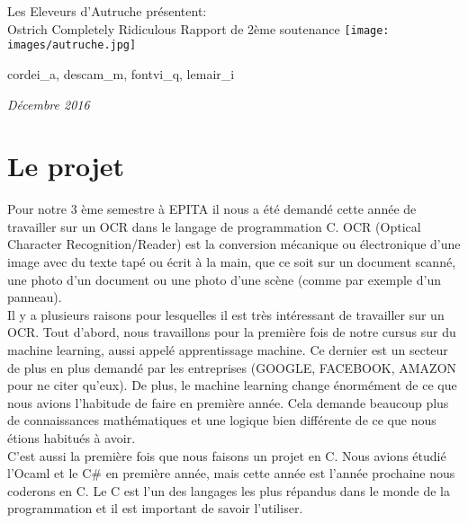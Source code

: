\documentclass[14pt]{article}
\begin{document}
\begin{center}
\huge Les Eleveurs d'Autruche 
\newline
\LARGE pr\'esentent:
\\
\huge Ostrich Completely Ridiculous
\huge Rapport de 2\`eme soutenance
\newline
\newline
\newline
\texttt{[image: images/autruche.jpg]}
\renewcommand{\footrulewidth}{1pt}
\begin{description}
\large
\item[Auteurs : ] cordei\_a, descam\_m, fontvi\_q, lemair\_i
\end{description}
\large 
\textit{Décembre 2016}
\end{center}

\newpage
\tableofcontents{}

\newpage
\section{Le projet}
Pour notre 3 ème semestre à EPITA il nous a été demandé cette année de travailler sur un OCR dans le langage de programmation C. OCR (Optical Character Recognition/Reader) est la conversion mécanique ou électronique d'une image avec du texte tapé ou écrit à la main, que ce soit sur un document scanné, une photo d'un document ou une photo d'une scène (comme par exemple d'un panneau).
\\
Il y a plusieurs raisons pour lesquelles il est très intéressant de travailler sur un OCR. Tout d'abord, nous travaillons pour la première fois de notre cursus sur du machine learning, aussi appelé apprentissage machine. Ce dernier est un secteur de plus en plus demandé par les entreprises (GOOGLE, FACEBOOK, AMAZON pour ne citer qu'eux). De plus, le machine learning change énormément de ce que nous avions l'habitude de faire en première année. Cela demande beaucoup plus de connaissances mathématiques et une logique bien différente de ce que nous étions habitués à avoir.
\\
C'est aussi la première fois que nous faisons un projet en C. Nous avions étudié l'Ocaml et le C\# en première année, mais cette année est l'année prochaine nous coderons en C. Le C est l'un des langages les plus répandus dans le monde de la programmation et il est important de savoir l'utiliser.
\newpage
\end{document}
